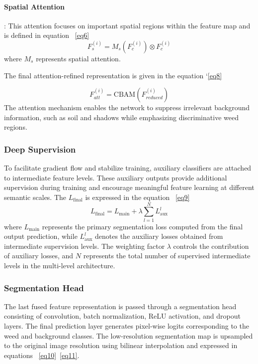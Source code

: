 \documentclass[pdflatex,sn-mathphys-num]{sn-jnl}
\begin{document}
\paragraph{Spatial Attention}: This attention focuses on important spatial regions within the feature map and is defined in equation ~\ref{eq6}
\begin{equation}
F_{s}^{(i)} = M_s(F_c^{(i)}) \otimes F_c^{(i)}\label{eq6}
\end{equation}
where $M_s$ represents spatial attention.

The final attention-refined representation is given in the equation `\ref{eq8}

\begin{equation}
F_{att}^{(i)} = \text{CBAM}(F_{reduced}^{(i)})\label{eq8}
\end{equation}
The attention mechanism enables the network to suppress irrelevant background information, such as soil and shadows while emphasizing discriminative weed regions.
\subsubsection{Deep Supervision}
To facilitate gradient flow and stabilize training, auxiliary classifiers are attached to intermediate feature levels. These auxiliary outputs provide additional supervision during training and encourage meaningful feature learning at different semantic scales. The $L_{\text{final}}$ is expressed in the equation ~\ref{eq9}
\begin{equation}
L_{\text{final}} = L_{\text{main}} + \lambda \sum_{l=1}^{N} L_{\text{aux}}^{l}\label{eq9}
\end{equation}
where \(L_{\text{main}}\) represents the primary segmentation loss computed from the final output prediction, while \(L_{\text{aux}}^{l}\) denotes the auxiliary losses obtained from intermediate supervision levels. The weighting factor \(\lambda\) controls the contribution of auxiliary losses, and \(N\) represents the total number of supervised intermediate levels in the multi-level architecture.
\subsubsection{Segmentation Head}
The last fused feature representation is passed through a segmentation head consisting of convolution, batch normalization, ReLU activation, and dropout layers. The final prediction layer generates pixel-wise logits corresponding to the weed and background classes. 
The low-resolution segmentation map is upsampled to the original image resolution using bilinear interpolation and expressed in equations ~\ref{eq10}~\ref{eq11}.
\end{document}
